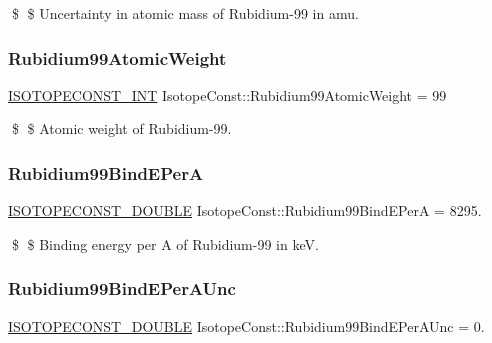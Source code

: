 \$ \$ Uncertainty in atomic mass of Rubidium-\/99 in amu. \mbox{\label{group___isotope_const-_rubidium-_rb99_gab406c095603acbf75579f417e24d79d1}} 
\subsubsection{\texorpdfstring{Rubidium99\+Atomic\+Weight}{Rubidium99AtomicWeight}}
{\footnotesize\ttfamily \mbox{\hyperlink{group___isotope_const-_macros_ga5f18360b3e99483a35c32d789e62621c}{I\+S\+O\+T\+O\+P\+E\+C\+O\+N\+S\+T\+\_\+\+I\+NT}} Isotope\+Const\+::\+Rubidium99\+Atomic\+Weight = 99}

\$ \$ Atomic weight of Rubidium-\/99. \mbox{\label{group___isotope_const-_rubidium-_rb99_ga6d169bf6039b3173d1674efea906f47c}} 
\subsubsection{\texorpdfstring{Rubidium99\+Bind\+E\+PerA}{Rubidium99BindEPerA}}
{\footnotesize\ttfamily \mbox{\hyperlink{group___isotope_const-_macros_ga8f45a7272ce02c0b4c65c44636ed719a}{I\+S\+O\+T\+O\+P\+E\+C\+O\+N\+S\+T\+\_\+\+D\+O\+U\+B\+LE}} Isotope\+Const\+::\+Rubidium99\+Bind\+E\+PerA = 8295.}

\$ \$ Binding energy per A of Rubidium-\/99 in keV. \mbox{\label{group___isotope_const-_rubidium-_rb99_ga83399b25b2fbe0c9cfeaabcc51d1aae9}} 
\subsubsection{\texorpdfstring{Rubidium99\+Bind\+E\+Per\+A\+Unc}{Rubidium99BindEPerAUnc}}
{\footnotesize\ttfamily \mbox{\hyperlink{group___isotope_const-_macros_ga8f45a7272ce02c0b4c65c44636ed719a}{I\+S\+O\+T\+O\+P\+E\+C\+O\+N\+S\+T\+\_\+\+D\+O\+U\+B\+LE}} Isotope\+Const\+::\+Rubidium99\+Bind\+E\+Per\+A\+Unc = 0.}

